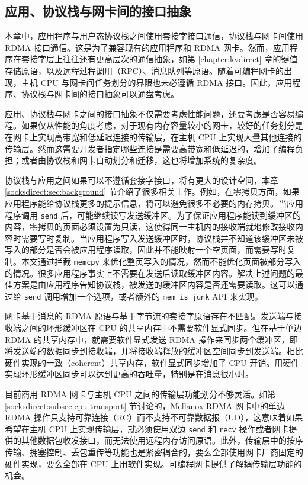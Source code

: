 \subsection{应用、协议栈与网卡间的接口抽象}
\label{future:nic-interface}

本章中，应用程序与用户态协议栈之间使用套接字接口通信，协议栈与网卡间使用 RDMA 接口通信。这是为了兼容现有的应用程序和 RDMA 网卡。然而，应用程序在套接字层上往往还有更高层次的通信抽象，如第 \ref{chapter:kvdirect} 章的键值存储原语，以及远程过程调用（RPC）、消息队列等原语。随着可编程网卡的出现，主机 CPU 与网卡间任务划分的界限也未必遵循 RDMA 接口。因此，应用程序、协议栈与网卡间的接口抽象可以通盘考虑。

应用、协议栈与网卡之间的接口抽象不仅需要考虑性能问题，还要考虑是否容易编程。如果仅从性能的角度考虑，对于现有内存容量较小的网卡，较好的任务划分是在网卡上实现高带宽和低延迟连接的传输层，在主机 CPU 上实现大量其他连接的传输层。然而这需要开发者指定哪些连接是需要高带宽和低延迟的，增加了编程负担；或者由协议栈和网卡自动划分和迁移，这也将增加系统的复杂度。

协议栈与应用之间如果可以不遵循套接字接口，将有更大的设计空间，本章 \ref{socksdirect:sec:background} 节介绍了很多相关工作。例如，在零拷贝方面，如果应用程序能给协议栈更多的提示信息，将可以避免很多不必要的内存拷贝。当应用程序调用 \texttt{send} 后，可能继续读写发送缓冲区。为了保证应用程序能读到缓冲区的内容，零拷贝的页面必须设置为只读，这使得同一主机内的接收端就地修改接收内容时需要写时复制。当应用程序写入发送缓冲区时，协议栈并不知道该缓冲区未被写入的部分是否会被应用程序读取，因此并不能映射一个空页面，而需要写时复制。本文通过拦截 \texttt{memcpy} 来优化整页写入的情况，然而不能优化页面被部分写入的情况。很多应用程序事实上不需要在发送后读取缓冲区内容。解决上述问题的最佳方案是由应用程序告知协议栈，被发送的缓冲区内容是否还需要读取。这可以通过给 \texttt{send} 调用增加一个选项，或者额外的 \texttt{mem\_is\_junk} API 来实现。

网卡基于消息的 RDMA 原语与基于字节流的套接字原语存在不匹配。发送端与接收端之间的环形缓冲区在 CPU 的共享内存中不需要软件显式同步。但在基于单边 RDMA 的共享内存中，就需要软件显式发送 RDMA 操作来同步两个缓冲区，即将发送端的数据同步到接收端，并将接收端释放的缓冲区空间同步到发送端。相比硬件实现的一致（coherent）共享内存，软件显式同步增加了 CPU 开销。用硬件实现环形缓冲区同步可以达到更高的吞吐量，特别是在消息很小时。

目前商用 RDMA 网卡与主机 CPU 之间的传输层功能划分不够灵活。如第 \ref{socksdirect:subsec:cpu-transport} 节讨论的，Mellanox RDMA 网卡中的单边 RDMA 操作只支持可靠连接（RC）而不支持不可靠数据报（UD），这意味着如果希望在主机 CPU 上实现传输层，就必须使用双边 \texttt{send} 和 \texttt{recv} 操作或者网卡提供的其他数据包收发接口，而无法使用远程内存访问原语。此外，传输层中的按序传输、拥塞控制、丢包重传等功能也是紧密耦合的，要么全部使用网卡厂商固定的硬件实现，要么全部在 CPU 上用软件实现。可编程网卡提供了解耦传输层功能的机会。

